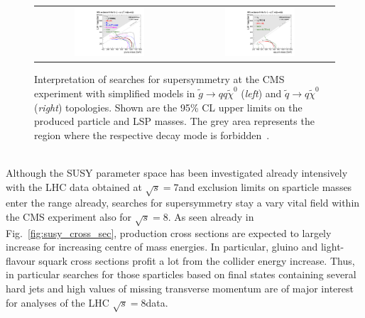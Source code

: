 \begin{figure}[!tp]
  \centering 
  \begin{tabular}{cc}
    \includegraphics[width=0.49\textwidth]{figures/T1_7TeV.pdf} &
    \includegraphics[width=0.49\textwidth]{figures/T2_7TeV.pdf}
  \end{tabular}
  \caption{Interpretation of searches for supersymmetry at the CMS experiment with simplified models in $\tilde{g} \rightarrow qq\tilde{\chi}^0$ (\textit{left}) and $\tilde{q} \rightarrow q \tilde{\chi}^0$ (\textit{right}) topologies. Shown are the 95\% CL upper limits on the produced particle and LSP masses. The grey area represents the region where the respective decay mode is forbidden~\cite{Chatrchyan:2013sza}.}
  \label{fig:SMS_7TeV}
\end{figure}
\\
Although the SUSY parameter space has been investigated already intensively with the LHC data obtained at $\sqrt{s} = 7$\tev and exclusion limits on sparticle masses enter the \tev range already, searches for supersymmetry stay a vary vital field within the CMS experiment also for $\sqrt{s} = 8$\tev. As seen already in Fig.~\ref{fig:susy_cross_sec}, production cross sections are expected to largely increase for increasing centre of mass energies. In particular, gluino and light-flavour squark cross sections profit a lot from the collider energy increase. Thus, in particular searches for those sparticles based on final states containing several hard jets and high values of missing transverse momentum are of major interest for analyses of the LHC $\sqrt{s} = 8$\tev data.   






